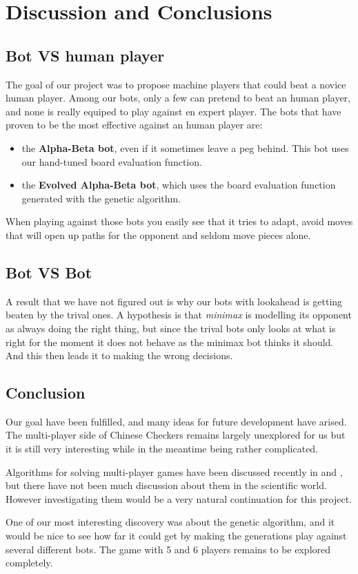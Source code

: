 \section{Discussion and Conclusions}
\subsection{Bot VS human player}
The goal of our project was to propose machine players that could beat a
novice human player. Among our bots, only a few can pretend to beat an human
player, and none is really equiped to play against en expert player. The bots
that have proven to be the most effective against an human player are:
\begin{itemize}
  \item the \textbf{Alpha-Beta bot}, even if it sometimes leave a peg behind.
        This bot uses our hand-tuned board evaluation function.
  \item the \textbf{Evolved Alpha-Beta bot}, which uses the board evaluation
        function generated with the genetic algorithm.
\end{itemize}

When playing against those bots you easily see that it tries to adapt, avoid
moves that will open up paths for the opponent and seldom move pieces alone.


\subsection{Bot VS Bot}
A result that we have not figured out is why our bots with lookahead is
getting beaten by the trival ones. A hypothesis is that \emph{minimax} is modelling
its opponent as always doing the right thing, but since the trival bots only
looks at what is right for the moment it does not behave as the minimax
bot thinks it should. And this then leads it to making the wrong decisions.

\subsection{Conclusion}
Our goal have been fulfilled, and many ideas for future development have
arised. The multi-player side of Chinese Checkers remains largely unexplored
for us but it is still very interesting while in the meantime being rather
complicated.

Algorithms for solving multi-player games have been discussed recently in
\cite{Hashavit} and \cite{bestreplysearch}, but there have not been much
discussion about them in the scientific world. However investigating them
would be a very natural continuation for this project.

One of our most interesting discovery was about the genetic algorithm, and
it would be nice to see how far it could get by making the generations play
against several different bots. The game with 5 and 6 players remains to be
explored completely.

